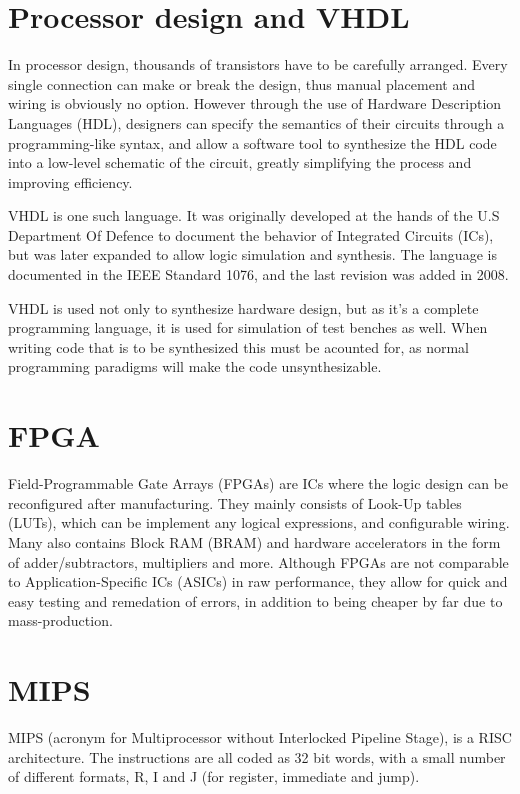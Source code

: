 \section{Processor design and VHDL}
In processor design, thousands of transistors have to be carefully arranged.
Every single connection can make or break the design, thus manual placement and
wiring is obviously no option.  However through the use of Hardware Description
Languages (HDL), designers can specify the semantics of their circuits through a
programming-like syntax, and allow a software tool to synthesize the HDL code
into a low-level schematic of the circuit, greatly simplifying the process and
improving efficiency.


VHDL is one such language.  It was originally developed at the hands of the U.S
Department Of Defence to document the behavior of Integrated Circuits (ICs), but
was later expanded to allow logic simulation and synthesis. The language is
documented in the IEEE Standard 1076, and the last revision was added in
2008.\cite{ieee-1076}

VHDL is used not only to synthesize hardware design, but as it's a complete
programming language, it is used for simulation of test benches as well. When
writing code that is to be synthesized this must be acounted for, as normal
programming paradigms will make the code unsynthesizable.


\section{FPGA}
Field-Programmable Gate Arrays (FPGAs) are ICs where the logic design can be
reconfigured after manufacturing.  They mainly consists of Look-Up tables
(LUTs), which can be implement any logical expressions, and configurable wiring.
Many also contains Block RAM (BRAM) and hardware accelerators in the form of
adder/subtractors, multipliers and more.  Although FPGAs are not comparable to
Application-Specific ICs (ASICs) in raw performance, they allow for quick and
easy testing and remedation of errors, in addition to being cheaper by far due
to mass-production.


\section{MIPS}
MIPS (acronym for Multiprocessor without Interlocked Pipeline Stage), is a RISC
architecture. The instructions are all coded as 32 bit words, with a small
number of different formats, R, I and J (for register, immediate and jump). 

